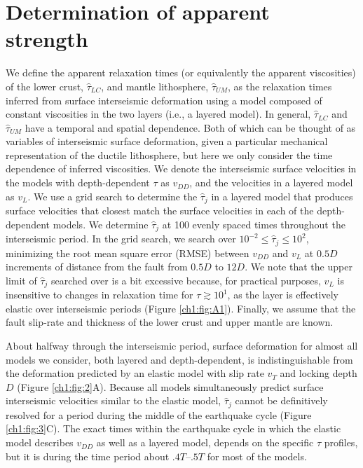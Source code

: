 \section{Determination of apparent strength} 
We define the apparent relaxation times (or equivalently the apparent
viscosities) of the lower crust, $\hat{\tau}_{LC}$, and mantle
lithosphere, $\hat{\tau}_{UM}$, as the relaxation times inferred from
surface interseismic deformation using a model composed of constant
viscosities in the two layers (i.e., a layered model). In general,
$\hat{\tau}_{LC}$ and $\hat{\tau}_{UM}$ have a temporal
\citep{Riva2009} and spatial \citep{Yamasaki2012} dependence.  Both of
which can be thought of as variables of interseismic surface
deformation, given a particular mechanical representation of the
ductile lithosphere, but here we only consider the time dependence of
inferred viscosities.  We denote the interseismic surface velocities
in the models with depth-dependent $\tau$ as $v_{DD}$, and the
velocities in a layered model as $v_{L}$.  We use a grid search to
determine the $\hat{\tau}_j$ in a layered model that produces surface
velocities that closest match the surface velocities in each of the
depth-dependent models. We determine $\hat{\tau}_j$ at 100 evenly
spaced times throughout the interseismic period.  In the grid search,
we search over $10^{-2} \leq \hat{\tau}_j \leq 10^2$, minimizing the
root mean square error (RMSE) between $v_{DD}$ and $v_L$ at $0.5D$
increments of distance from the fault from $0.5D$ to $12D$\@.  We note
that the upper limit of $\hat{\tau}_j$ searched over is a bit
excessive because, for practical purposes, $v_{L}$ is insensitive to
changes in relaxation time for $\tau \gtrsim 10^1$, as the layer is
effectively elastic over interseismic periods \citep{Savage1978}
(Figure \ref{ch1:fig:A1}). Finally, we assume that the fault slip-rate
and thickness of the lower crust and upper mantle are known.

About halfway through the interseismic period, surface deformation for
almost all models we consider, both layered and depth-dependent, is
indistinguishable from the deformation predicted by an elastic model
with slip rate $v_T$ and locking depth $D$ \citep{Savage1973a} (Figure
\ref{ch1:fig:2}A). Because all models simultaneously predict surface
interseismic velocities similar to the elastic model, $\hat{\tau}_j$
cannot be definitively resolved for a period during the middle of the
earthquake cycle (Figure \ref{ch1:fig:3}C). The exact times within the
earthquake cycle in which the elastic model describes $v_{DD}$ as well
as a layered model, depends on the specific $\tau$ profiles, but it is
during the time period about $.4T$--$.5T$ for most of the models.

